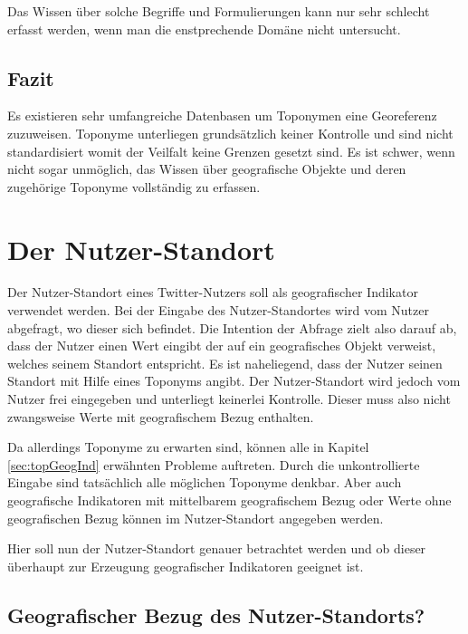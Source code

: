 			Das Wissen über solche Begriffe und Formulierungen kann nur sehr schlecht erfasst werden, wenn man die enstprechende Domäne nicht untersucht. 



		\subsection{Fazit}

			Es existieren sehr umfangreiche Datenbasen um Toponymen eine Georeferenz zuzuweisen. 
			Toponyme unterliegen grundsätzlich keiner Kontrolle und sind nicht standardisiert womit der Veilfalt keine Grenzen gesetzt sind.
			Es ist schwer, wenn nicht sogar unmöglich, das Wissen über geografische Objekte und deren zugehörige Toponyme vollständig zu erfassen.
	
	\section{Der Nutzer-Standort} \label{sec:nutzerStandort} 

		Der Nutzer-Standort eines Twitter-Nutzers soll als geografischer Indikator verwendet werden.
		Bei der Eingabe des Nutzer-Standortes wird vom Nutzer abgefragt, wo dieser sich befindet. 
		Die Intention der Abfrage zielt also darauf ab, dass der Nutzer einen Wert eingibt der auf ein geografisches Objekt verweist, welches seinem Standort entspricht. 
		Es ist naheliegend, dass der Nutzer seinen Standort mit Hilfe eines Toponyms angibt.
		Der Nutzer-Standort wird jedoch vom Nutzer frei eingegeben und unterliegt keinerlei Kontrolle.
		Dieser muss also nicht zwangsweise Werte mit geografischem Bezug enthalten. 

		Da allerdings Toponyme zu erwarten sind, können alle in Kapitel \ref{sec:topGeogInd} erwähnten Probleme auftreten.
		Durch die unkontrollierte Eingabe sind tatsächlich alle möglichen Toponyme denkbar.
		Aber auch geografische Indikatoren mit mittelbarem geografischem Bezug oder Werte ohne geografischen Bezug können im Nutzer-Standort angegeben werden.		

		Hier soll nun der Nutzer-Standort genauer betrachtet werden und ob dieser überhaupt zur Erzeugung geografischer Indikatoren geeignet ist.

		\subsection*{Geografischer Bezug des Nutzer-Standorts?} 
			
